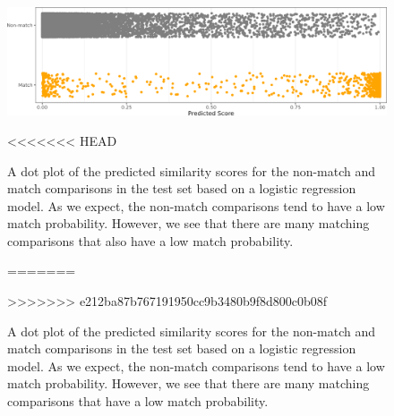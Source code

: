 \documentclass[reprint]{JASA}
\begin{document}
\begin{figure}[htbp]

{\centering \includegraphics[width=.5\textwidth]{images/resultsPlots/testProbs_plt} 

}

<<<<<<< HEAD
\caption{\label{fig:testProbs} A dot plot of the predicted similarity scores for the non-match and match comparisons in the test set based on a logistic regression model. As we expect, the non-match comparisons tend to have a low match probability. However, we see that there are many matching comparisons that also have a low match probability.}\label{fig:unnamed-chunk-10}
=======
\caption{\label{fig:testProbs} A dot plot of the predicted similarity scores for the non-match and match comparisons in the test set based on a logistic regression model. As we expect, the non-match comparisons tend to have a low match probability. However, we see that there are many matching comparisons that have a low match probability.}\label{fig:unnamed-chunk-10}
>>>>>>> e212ba87b767191950cc9b3480b9f8d800c0b08f
\end{figure}
\end{document}
